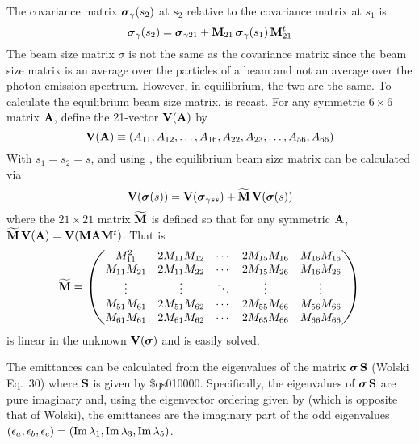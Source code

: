 The covariance matrix ${\boldsymbol{\sigma}}_\gamma(s_2)$ at $s_2$ relative to the covariance matrix at $s_1$ is
\begin{equation}
  {\boldsymbol{\sigma}}_\gamma(s_2) = {\boldsymbol{\sigma}}_{\gamma21} + {\bf M}_{21} \, {\boldsymbol{\sigma}}_\gamma(s_1) \, {\bf M}_{21}^t
  \label{ssmsm}
\end{equation}
The beam size matrix $\sigma$ is not the same as the covariance matrix since the beam size matrix is
an average over the particles of a beam and not an average over the photon emission
spectrum. However, in equilibrium, the two are the same. To calculate the equilibrium beam size
matrix,  is recast. For any symmetric $6\times6$ matrix ${\bf A}$, define the 21-vector
${\bf V}({\bf A})$ by
\begin{equation}
  {\bf V}({\bf A}) \equiv (A_{11}, A_{12}, \ldots, A_{16}, A_{22}, A_{23}, \ldots, A_{56}, A_{66})
\end{equation}
With $s_1 = s_2 = s$, and using , the equilibrium beam size matrix can be calculated via
\begin{equation}
  {\bf V}({\boldsymbol{\sigma}}(s)) = {\bf V}({\boldsymbol{\sigma}}_{\gamma ss}) + \widetilde{{\bf M}} \, {\bf V}({\boldsymbol{\sigma}}(s))
  \label{vsmv}
\end{equation}
where the $21\times21$ matrix $\widetilde{{\bf M}}$ is defined so that for any symmetric ${\bf A}$, $\widetilde{{\bf M}} \, {\bf V}({\bf A}) =
{\bf V}({\bf M}{\bf A}{\bf M}^t)$. That is
\begin{equation}
  \widetilde{{\bf M}} = \begin{pmatrix}
    M_{11}^2      & 2 M_{11} M_{12} & \cdots & 2 M_{15} M_{16} & M_{16} M_{16} \\
    M_{11} M_{21} & 2 M_{11} M_{22} & \cdots & 2 M_{15} M_{26} & M_{16} M_{26} \\
    \vdots        & \vdots          & \ddots & \vdots          & \vdots      \\
    M_{51} M_{61} & 2 M_{51} M_{62} & \cdots & 2 M_{55} M_{66} & M_{56} M_{66} \\
    M_{61} M_{61} & 2 M_{61} M_{62} & \cdots & 2 M_{65} M_{66} & M_{66} M_{66}
  \end{pmatrix}
\end{equation}
 is linear in the unknown ${\bf V}({\boldsymbol{\sigma}})$ and is easily solved.

The emittances can be calculated from the eigenvalues of the matrix ${\boldsymbol{\sigma}} \, {\bf S}$
(Wolski\cite{b:wolski.coupling} Eq.~30) where ${\bf S}$ is given by \$q{s010000}. Specifically, the
eigenvalues of ${\boldsymbol{\sigma}} \, {\bf S}$ are pure imaginary and, using the eigenvector ordering given by
 (which is opposite that of Wolski), the emittances are the imaginary part of the odd
eigenvalues $(\epsilon_a, \epsilon_b, \epsilon_c) = (\operatorname{Im}{\lambda_1}, \operatorname{Im}{\lambda_3}, \operatorname{Im}{\lambda_5})$.


